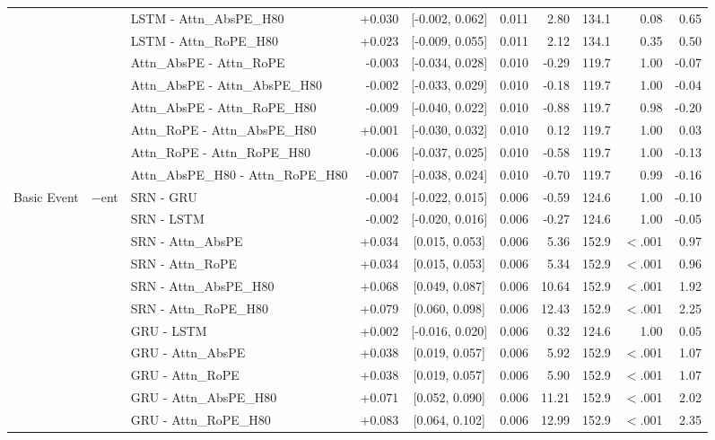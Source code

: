 \begin{longtable}{@{}lllrcrrrrr@{}}
 &  & LSTM - Attn\_AbsPE\_H80 & +0.030 & [-0.002, 0.062] & 0.011 & 2.80 & 134.1 & 0.08 & 0.65 \\
 &  & LSTM - Attn\_RoPE\_H80 & +0.023 & [-0.009, 0.055] & 0.011 & 2.12 & 134.1 & 0.35 & 0.50 \\
 &  & Attn\_AbsPE - Attn\_RoPE & -0.003 & [-0.034, 0.028] & 0.010 & -0.29 & 119.7 & 1.00 & -0.07 \\
 &  & Attn\_AbsPE - Attn\_AbsPE\_H80 & -0.002 & [-0.033, 0.029] & 0.010 & -0.18 & 119.7 & 1.00 & -0.04 \\
 &  & Attn\_AbsPE - Attn\_RoPE\_H80 & -0.009 & [-0.040, 0.022] & 0.010 & -0.88 & 119.7 & 0.98 & -0.20 \\
 &  & Attn\_RoPE - Attn\_AbsPE\_H80 & +0.001 & [-0.030, 0.032] & 0.010 & 0.12 & 119.7 & 1.00 & 0.03 \\
 &  & Attn\_RoPE - Attn\_RoPE\_H80 & -0.006 & [-0.037, 0.025] & 0.010 & -0.58 & 119.7 & 1.00 & -0.13 \\
 &  & Attn\_AbsPE\_H80 - Attn\_RoPE\_H80 & -0.007 & [-0.038, 0.024] & 0.010 & -0.70 & 119.7 & 0.99 & -0.16 \\
\addlinespace[2pt]
\addlinespace
Basic Event & $-$ent & SRN - GRU & -0.004 & [-0.022, 0.015] & 0.006 & -0.59 & 124.6 & 1.00 & -0.10 \\
 &  & SRN - LSTM & -0.002 & [-0.020, 0.016] & 0.006 & -0.27 & 124.6 & 1.00 & -0.05 \\
 &  & SRN - Attn\_AbsPE & +0.034 & [0.015, 0.053] & 0.006 & 5.36 & 152.9 & $<$.001 & 0.97 \\
 &  & SRN - Attn\_RoPE & +0.034 & [0.015, 0.053] & 0.006 & 5.34 & 152.9 & $<$.001 & 0.96 \\
 &  & SRN - Attn\_AbsPE\_H80 & +0.068 & [0.049, 0.087] & 0.006 & 10.64 & 152.9 & $<$.001 & 1.92 \\
 &  & SRN - Attn\_RoPE\_H80 & +0.079 & [0.060, 0.098] & 0.006 & 12.43 & 152.9 & $<$.001 & 2.25 \\
 &  & GRU - LSTM & +0.002 & [-0.016, 0.020] & 0.006 & 0.32 & 124.6 & 1.00 & 0.05 \\
 &  & GRU - Attn\_AbsPE & +0.038 & [0.019, 0.057] & 0.006 & 5.92 & 152.9 & $<$.001 & 1.07 \\
 &  & GRU - Attn\_RoPE & +0.038 & [0.019, 0.057] & 0.006 & 5.90 & 152.9 & $<$.001 & 1.07 \\
 &  & GRU - Attn\_AbsPE\_H80 & +0.071 & [0.052, 0.090] & 0.006 & 11.21 & 152.9 & $<$.001 & 2.02 \\
 &  & GRU - Attn\_RoPE\_H80 & +0.083 & [0.064, 0.102] & 0.006 & 12.99 & 152.9 & $<$.001 & 2.35 \\

\end{longtable}
